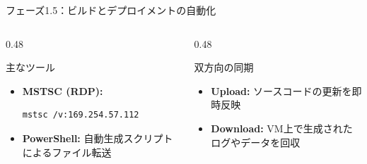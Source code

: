 \documentclass[10pt,aspectratio=169]{beamer}
\begin{document}
\begin{frame}[t,fragile]{フェーズ1.5：ビルドとデプロイメントの自動化}
  \vspace{-1em}
  \begin{columns}[T,onlytextwidth]
    \begin{column}{0.48\textwidth}
      \begin{block}{主なツール}
        \begin{itemize}\setlength\itemsep{0.25em}
          \item \textbf{MSTSC (RDP):}
          \begin{lstlisting}[numbers=none,frame=single]
          mstsc /v:169.254.57.112
          \end{lstlisting}
          \item \textbf{PowerShell:} 自動生成スクリプトによるファイル転送
        \end{itemize}
      \end{block}
    \end{column}
    \begin{column}{0.48\textwidth}
      \begin{block}{双方向の同期}
        \begin{itemize}\setlength\itemsep{0.25em}
          \item \textbf{Upload:} ソースコードの更新を即時反映
          \item \textbf{Download:} VM上で生成されたログやデータを回収
        \end{itemize}
      \end{block}
    \end{column}
  \end{columns}
\end{frame}
\end{document}

